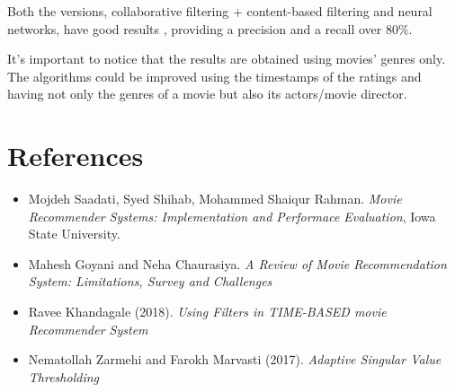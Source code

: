 \documentclass{article}
\begin{document}
Both the versions, collaborative filtering + content-based filtering and neural networks, have good results , providing a precision and a recall over 80\%. 

It's important to notice that the results are obtained using movies' genres only. The algorithms could be improved using the timestamps of the ratings and having not only the genres of a movie but also its actors/movie director.


\section{References}
\begin{itemize}
      \item Mojdeh Saadati, Syed Shihab, Mohammed Shaiqur Rahman. \textsl{Movie Recommender Systems: Implementation and Performace Evaluation}, Iowa State University.
      \item Mahesh Goyani and Neha Chaurasiya. \textsl{A Review of Movie Recommendation System: Limitations, Survey and Challenges}
      \item Ravee Khandagale (2018). \textsl{Using Filters in TIME-BASED movie Recommender System}
      \item Nematollah Zarmehi and Farokh Marvasti (2017). \textsl{Adaptive Singular Value Thresholding}
\end{itemize}
\end{document}
